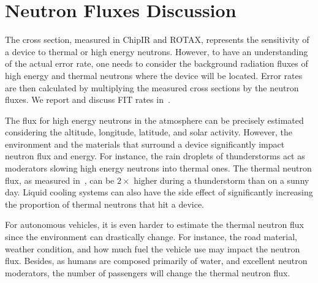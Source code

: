 
\section{Neutron Fluxes Discussion}
\label{sec_fit}

The cross section, measured in ChipIR and ROTAX, represents the sensitivity of a device to thermal or high energy neutrons. However, to have an understanding of the actual error rate, one needs to consider the background radiation fluxes of high energy and thermal neutrons where the device will be located. Error rates are then calculated by multiplying the measured cross sections by the neutron fluxes. We report and discuss FIT rates in~\cite{jsc2020}.

The flux for high energy neutrons in the atmosphere can be precisely estimated considering the altitude, longitude, latitude, and solar activity. However, the environment and the materials that surround a device significantly impact neutron flux and energy.  For instance, the rain droplets of thunderstorms act as moderators slowing high energy neutrons into thermal ones. The thermal neutron flux, as measured in~\cite{ziegler2003}, can be $2\times$ higher during a thunderstorm than on a sunny day. Liquid cooling systems can also have the side effect of significantly increasing the proportion of thermal neutrons that hit a device.

For autonomous vehicles, it is even harder to estimate the thermal neutron flux since the environment can drastically change. For instance, the road material, weather condition, and how much fuel the vehicle use may impact the neutron flux. Besides, as humans are composed primarily of water, and excellent neutron moderators, the number of passengers will change the thermal neutron flux.

